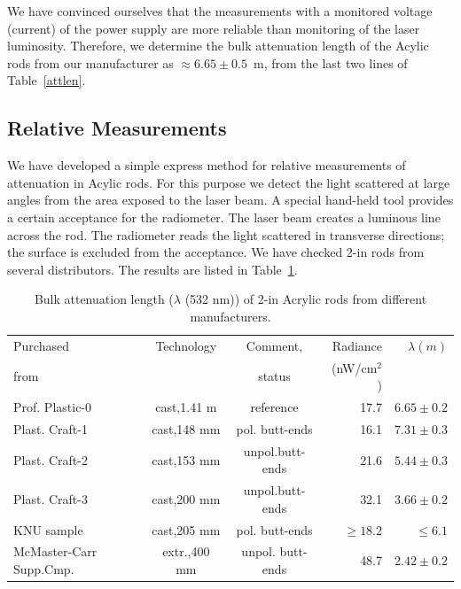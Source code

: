 We have convinced ourselves that the measurements with a monitored voltage
(current) of the power supply are more reliable than monitoring of the laser  
luminosity.  Therefore, we determine the bulk attenuation length of the 
Acylic rods from our manufacturer as $\approx 6.65\pm0.5$~m, from the last 
two lines of Table~\ref{attlen}.

\subsection{Relative Measurements}

We have developed a simple express method for relative measurements of  
attenuation in Acylic rods.  For this purpose we detect the light scattered 
at large angles from the area exposed to the laser beam.  A special hand-held  
tool provides a certain acceptance for the radiometer.  The laser beam creates 
a luminous line across the rod.  The radiometer reads the light scattered in 
transverse directions; the surface is excluded from the acceptance.  We have 
checked 2-in rods from several distributors.  The results are listed in 
Table~\ref{samatt}.

\begin{table}[htbp]
\begin{center}
\begin{tabular}{|l|c|c|r|r|} \hline
 Purchased     & Technology  & Comment,        & Radiance    & $\lambda(m)$ \\
    from       &             &  status         & (nW/cm$^2$) &              \\ \hline
Prof. Plastic-0& cast,1.41 m & reference       & 17.7        & $6.65\pm0.2$  \\ \hline
Plast. Craft-1 & cast,148 mm & pol. butt-ends  & 16.1        & $7.31\pm0.3$ \\ \hline
Plast. Craft-2 & cast,153 mm &unpol.butt-ends  & 21.6        & $5.44\pm0.3$ \\ \hline
Plast. Craft-3 & cast,200 mm &unpol.butt-ends  & 32.1        & $3.66\pm0.2$ \\ \hline
KNU sample     & cast,205 mm & pol. butt-ends  & $\ge18.2$   & $\leq 6.1$    \\ \hline  
McMaster-Carr Supp.Cmp.& extr.,400 mm & unpol. butt-ends & 48.7 & $2.42\pm0.2$ \\ \hline
\end{tabular}
\end{center}
\caption{\small{Bulk attenuation length ($\lambda$ (532 nm)) of 2-in Acrylic 
rods from different manufacturers.}}
\label{samatt}
\end{table}

